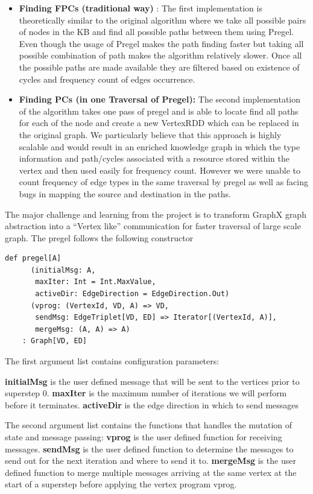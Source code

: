 \documentclass{easychair}
\begin{document}
\begin{itemize}
\item \textbf{Finding FPCs (traditional way)} : The first implementation is theoretically similar to the  original algorithm where we take all possible pairs of nodes in the KB and find all possible paths between them using Pregel. Even though the usage of Pregel makes the path finding faster but taking all possible combination of path makes the algorithm relatively slower. Once all the possible paths are made available they are filtered based on existence of cycles and frequency count of edges occurrence.
\item \textbf{Finding PCs (in one Traversal of Pregel):} The second implementation of the algorithm takes one pass of pregel and is able to locate find all paths for each of the node and create a new VertexRDD which can be replaced in the original graph. We particularly believe that this approach is highly scalable and would result in an enriched knowledge graph in which the type information and path/cycles associated with a resource stored within the vertex and then used easily for frequency count.  However we were unable to count frequency of edge types in the same traversal by pregel as well as facing bugs in mapping the source and destination in the paths.

\end{itemize}

The major challenge and learning from the project is to transform GraphX graph abstraction into a “Vertex like” communication for faster traversal of large scale graph. The pregel follows the following constructor

\begin{lstlisting}
def pregel[A]
      (initialMsg: A,
       maxIter: Int = Int.MaxValue,
       activeDir: EdgeDirection = EdgeDirection.Out)
      (vprog: (VertexId, VD, A) => VD,
       sendMsg: EdgeTriplet[VD, ED] => Iterator[(VertexId, A)],
       mergeMsg: (A, A) => A)
    : Graph[VD, ED]
\end{lstlisting}

The first argument list contains configuration parameters:

\textbf{initialMsg} is the user defined message that will be sent to the vertices prior to superstep 0. \textbf{maxIter} is the maximum number of iterations we will perform before it terminates. \textbf{activeDir} is the  edge direction in which to send messages

The second argument list contains the functions that handles the mutation of state and message passing: \textbf{vprog} is the user defined function for receiving messages.  \textbf{sendMsg} is the user defined function to determine the messages to send out for the next iteration and where to send it to.  \textbf{mergeMsg} is the user defined function to merge multiple messages arriving at the same vertex at the start of a superstep before applying the vertex program vprog.
\end{document}
